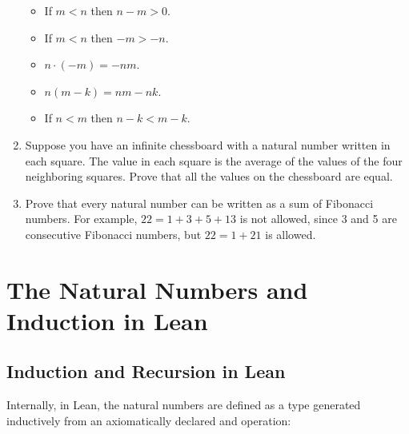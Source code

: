 \documentclass[letterpaper,10pt,english]{sphinxmanual}
\begin{document}
\begin{enumerate}
\begin{itemize}
\item {} 
\sphinxAtStartPar
If \(m < n\) then \(n - m > 0\).

\item {} 
\sphinxAtStartPar
If \(m < n\) then \(-m > -n\).

\item {} 
\sphinxAtStartPar
\(n \cdot (-m) = -nm\).

\item {} 
\sphinxAtStartPar
\(n(m - k) = nm - nk\).

\item {} 
\sphinxAtStartPar
If \(n < m\) then \(n - k < m - k\).

\end{itemize}

\item {} 
\sphinxAtStartPar
Suppose you have an infinite chessboard with a natural number written in each square. The value in each square is the average of the values of the four neighboring squares. Prove that all the values on the chessboard are equal.

\item {} 
\sphinxAtStartPar
Prove that every natural number can be written as a sum of  Fibonacci numbers. For example, \(22 = 1 + 3 + 5 + 13\) is not allowed, since 3 and 5 are consecutive Fibonacci numbers, but \(22 = 1 + 21\) is allowed.

\end{enumerate}


\chapter{The Natural Numbers and Induction in Lean}
\label{\detokenize{the_natural_numbers_and_induction_in_lean:the-natural-numbers-and-induction-in-lean}}\label{\detokenize{the_natural_numbers_and_induction_in_lean:id1}}\label{\detokenize{the_natural_numbers_and_induction_in_lean::doc}}

\section{Induction and Recursion in Lean}
\label{\detokenize{the_natural_numbers_and_induction_in_lean:induction-and-recursion-in-lean}}
\sphinxAtStartPar
Internally, in Lean, the natural numbers are defined as a type generated inductively from an axiomatically declared  and  operation:
\end{document}
